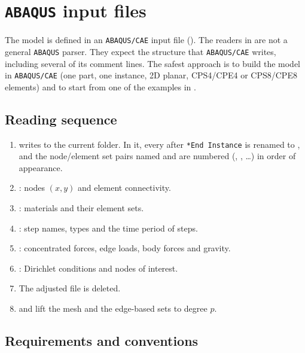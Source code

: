 \chapter{\texorpdfstring{\texttt{ABAQUS}}{ABAQUS} input files}
\label{ch:input}

The model is defined in an \texttt{ABAQUS/CAE} input file (). The readers in
 are not a general \texttt{ABAQUS} parser. They
expect the structure that \texttt{ABAQUS/CAE} writes, including several of its comment
lines. The safest approach is to build the model in \texttt{ABAQUS/CAE} (one part, one
instance, 2D planar, CPS4/CPE4 or CPS8/CPE8 elements) and to start from one of
the examples in .

\section{Reading sequence}

\begin{enumerate}
  \item {} writes
     to the current folder. In it, every 
    after \texttt{*End Instance} is renamed to , and the node/element
    set pairs named  and  are numbered
    (, , \dots) in order of appearance.
  \item {}: nodes $(x,y)$ and element connectivity.
  \item {}: materials and their element sets.
  \item {}: step names, types and the time period of
     steps.
  \item {}: concentrated forces, edge loads, body forces and
    gravity.
  \item {}: Dirichlet conditions and nodes of
    interest.
  \item The adjusted file is deleted.
  \item {} and  lift
    the mesh and the edge-based sets to degree $p$.
\end{enumerate}

\section{Requirements and conventions}

